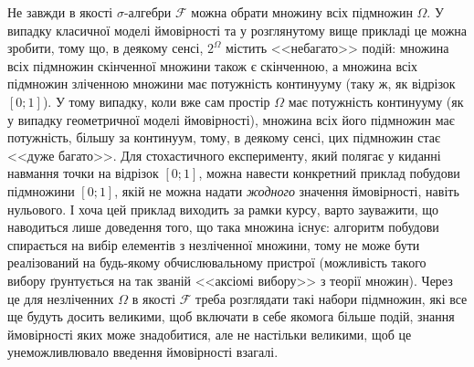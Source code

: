 \begin{remark}
    Не завжди в якості $\sigma$-алгебри $\mathcal{F}$ можна обрати множину всіх підмножин $\Omega$. 
    У випадку класичної моделі ймовірності та у розглянутому вище прикладі
    це можна зробити, тому що, в деякому сенсі, $2^{\Omega}$ містить <<небагато>> подій: множина всіх підмножин скінченної множини також
    є скінченною, а множина всіх підмножин зліченною множини має потужність континууму (таку ж, як відрізок $[0; 1]$).
    У тому випадку, коли вже сам простір $\Omega$ має потужність континууму (як у випадку геометричної моделі ймовірності),
    множина всіх його підмножин має потужність, більшу за континуум, тому, в деякому сенсі, цих підмножин стає <<дуже багато>>.
    Для стохастичного експерименту, який полягає у киданні навмання точки на відрізок $[0; 1]$,
    можна навести конкретний приклад побудови підмножини $[0; 1]$, якій не можна надати \emph{жодного} значення ймовірності, навіть нульового.
    І хоча цей приклад виходить за рамки курсу, варто зауважити, що наводиться лише доведення того, що така множина існує:
    алгоритм побудови спирається на вибір елементів з незліченної множини, тому не може бути реалізований на будь-якому обчислювальному пристрої
    (можливість такого вибору ґрунтується на так званій <<аксіомі вибору>> з теорії множин).
    Через це для незліченних $\Omega$ в якості $\mathcal{F}$ треба розглядати такі набори підмножин, які все ще будуть досить великими,
    щоб включати в себе якомога більше подій, знання ймовірності яких може знадобитися, але не настільки великими, щоб це унеможливлювало введення ймовірності взагалі.
\end{remark}

